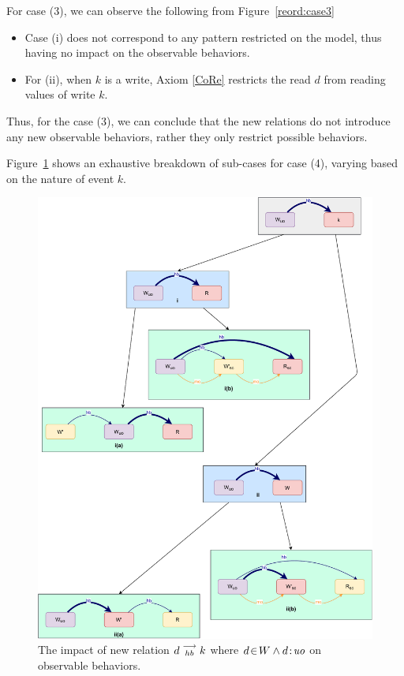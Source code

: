     For case (3), we can observe the following from Figure~\ref{reord:case3}
    \begin{itemize}
        \item Case (i) does not correspond to any pattern restricted on the model, thus having no impact on the observable behaviors. 
        \item For (ii), when $k$ is a write, Axiom \ref{CoRe} restricts the read $d$ from reading values of write $k$. 
    \end{itemize}

    Thus, for the case (3), we can conclude that the new relations do not introduce any new observable behaviors, rather they only restrict possible behaviors.

    Figure~\ref{reord:case4} shows an exhaustive breakdown of sub-cases for case (4), varying based on the nature of event $k$.
    \begin{figure}[H]
        \centering
        \includegraphics[scale=0.6]{4.InstructionReordering/4.ValidReorderingCandidate/ProofParts/Part4/part4(d).pdf}
        \caption{The impact of new relation $d\stackrel{\longrightarrow}{_{hb}}k$ where $d\!\in\!W \wedge d\!:\!\textit{uo}$ on observable behaviors.}
        \label{reord:case4}
    \end{figure}

